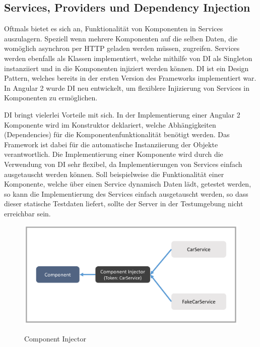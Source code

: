 \subsection{Services, Providers und Dependency Injection}
\label{sec:services}

Oftmals bietet es sich an, Funktionalität von Komponenten in Services auszulagern.
Speziell wenn mehrere Komponenten auf die selben Daten,
die womöglich asynchron per HTTP geladen werden müssen, zugreifen.
Services werden ebenfalls als Klassen implementiert, welche mithilfe von \ac{DI}
als Singleton instanziiert und in die Komponenten injiziert werden können.
\ac{DI} ist ein Design Pattern, welches bereits in der ersten Version des Frameworks implementiert war.
In Angular 2 wurde \ac{DI} neu entwickelt, um flexiblere Injizierung von Services in Komponenten zu ermöglichen.

\ac{DI} bringt vielerlei Vorteile mit sich. In der Implementierung einer Angular 2 Komponente wird im
Konstruktor deklariert, welche Abhängigkeiten (Dependencies) für die Komponentenfunktionalität benötigt werden.
Das Framework ist dabei für die automatische Instanziierung der Objekte verantwortlich.
Die Implementierung einer Komponente wird durch die Verwendung von \ac{DI} sehr flexibel,
da Implementierungen von Services einfach ausgetauscht werden können.
Soll beispielweise die Funktionalität einer Komponente, welche über einen Service dynamisch Daten lädt, getestet werden,
so kann die Implementierung des Services einfach ausgetauscht werden, so dass dieser statische Testdaten liefert,
sollte der Server in der Testumgebung nicht erreichbar sein.
\cite[281]{Angular2}


\vspace{0.3cm}

\begin{figure}[ht]
 \centering
 \includegraphics[width=0.8\linewidth]{kapitel3/component-injector.png}
 \caption{Component Injector}\cite[343]{Angular2}
\end{figure}
\vspace{0.3cm}

